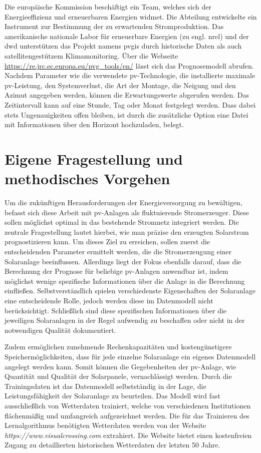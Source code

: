 \documentclass[12pt, a4paper]{article}
\begin{document}
Die europäische Kommission beschäftigt ein Team, welches sich der Energieeffizienz und erneuerbaren Energien widmet. Die Abteilung entwickelte ein Instrument zur Bestimmung der zu erwartenden Stromproduktion. Das amerikanische nationale Labor für erneuerbare Energien (zu engl. \ac{nrel}) und der \ac{dwd} unterstützen das Projekt namens \ac{pvgis} durch historische Daten als auch satellitengestützem Klimamonitoring.
Über die Webseite  \url{https://re.jrc.ec.europa.eu/pvg_tools/en/} lässt sich das Prognosemodell abrufen. Nachdem Parameter wie die verwendete \ac{pv}-Technologie, die installierte maximale \ac{pv}-Leistung, den Systemverlust, die Art der Montage, die Neigung und den Azimut angegeben werden, können die Erwartungswerte abgerufen werden. Das Zeitintervall kann auf eine Stunde, Tag oder Monat festgelegt werden. Dass dabei stets Ungenauigkeiten offen bleiben, ist durch die zusätzliche Option eine Datei mit Informationen über den Horizont hochzuladen, belegt.

\newpage

\section{Eigene Fragestellung und methodisches Vorgehen}

Um die zukünftigen Herausforderungen der Energieversorgung zu bewältigen, befasst sich diese Arbeit mit \ac{pv}-Anlagen als fluktuierende Stromerzeuger. Diese sollen möglichst optimal in das bestehende Stromnetz integriert werden. Die zentrale Fragestellung lautet hierbei, wie man präzise den erzeugten Solarstrom prognostizieren kann. Um dieses Ziel zu erreichen, sollen zuerst die entscheidenden Parameter ermittelt werden, die die Stromerzeugung einer Solaranlage beeinflussen. Allerdings liegt der Fokus ebenfalls darauf, dass die Berechnung der Prognose für beliebige \ac{pv}-Anlagen anwendbar ist, indem möglichst wenige spezifische Informationen über die Anlage in die Berechnung einfließen. Selbstverständlich spielen verschiedenste Eigenschaften der Solaranlage eine entscheidende Rolle, jedoch werden diese im Datenmodell nicht berücksichtigt. Schließlich sind diese spezifischen Informationen über die jeweiligen Solaranlagen in der Regel aufwendig zu beschaffen oder nicht in der notwendigen Qualität dokumentiert. 

Zudem ermöglichen zunehmende Rechenkapazitäten und kostengünstigere Speichermöglichkeiten, dass für jede einzelne Solaranlage ein eigenes Datenmodell angelegt werden kann. Somit können die Gegebenheiten der \ac{pv}-Anlage, wie Quantität und Qualität der Solarpanele, vernachlässigt werden. Durch die Trainingsdaten ist das Datenmodell selbstständig in der Lage, die Leistungsfähigkeit der Solaranlage zu beurteilen. Das Modell wird fast ausschließlich von Wetterdaten trainiert, welche von verschiedenen Institutionen flächenmäßig und umfangreich aufgezeichnet werden. Die für das Trainieren des Lernalgorithmus benötigten Wetterdaten werden von der Website \textit{https://www.visualcrossing.com} extrahiert. Die Website bietet einen kostenfreien Zugang zu detaillierten historischen Wetterdaten der letzten 50 Jahre.
\end{document}
